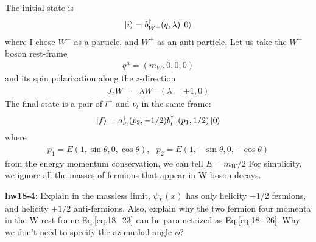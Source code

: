 \documentclass[12pt]{article}
\begin{document}
The initial state is
\begin{eqnarray}
    \ket{i}=b^\dagger_{W^+}(q,\lambda)\ket{0} \label{eq.18_22}
\end{eqnarray}
where I chose $W^-$ as a particle, and $W^+$ as an anti-particle.
Let us take the $W^+$ boson rest-frame
\begin{eqnarray}
    q^\mu = (m_W, 0, 0, 0)\label{eq.18_23}
\end{eqnarray}
and its spin polarization along the $z$-direction
\begin{eqnarray}
    J_z W^+ = \lambda W^+ ~(\lambda = \pm1,0) \label{eq.18_24}
\end{eqnarray}
The final state is a pair of $l^+$ and $\nu_l$ in the same frame:
\begin{eqnarray}
    \ket{f}=a^\dagger_{\nu_l}(p_2,-1/2) b^\dagger_{l^+}(p_1,1/2) \ket{0} \label{eq.18_25}
\end{eqnarray}
where
\begin{eqnarray}
p_1 = E(1,  \sin\theta, 0,  \cos\theta),~~~
p_2 = E(1, -\sin\theta, 0, -\cos\theta)\label{eq.18_26}
\end{eqnarray}
from the energy momentum conservation, we can tell $E = m_W/2$
For simplicity, we ignore all the masses of fermions that appear in
W-boson decays.

{\bf hw18-4}: Explain in the massless limit, $\psi_L(x)$ has only helicity
$-1/2$ fermions, and helicity $+1/2$ anti-fermions.  Also, explain
why the two fermion four momenta in the W rest frame Eq.\ref{eq.18_23} can
be parametrized as Eq.\ref{eq.18_26}. Why we don't need to specify the
azimuthal angle $\phi$?
\end{document}
